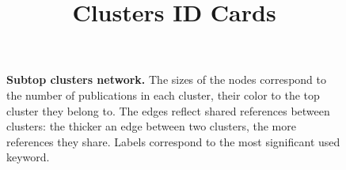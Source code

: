 \documentclass[a4paper,11pt]{report}
\title{{\bf Clusters ID Cards}}
\date{\begin{flushleft}This document gathers the ``ID Cards'' of the BC clusters found within the studied database.\\
 The BC network was built by linking pairs of publications based on the references they share - 9 out of 56 publications are in the network. The 4 clusters presented here correspond to the ones found in the subtop level grouping at least 1 publications. They gather a total of 9 publications. \\
 These ID cards displays the most frequent keywords, subject categories, journals of publication, institutions, countries, authors, references and reference journals of the publications of each cluster. The significance of an item $\sigma = \sqrt{N} (f - p) / \sqrt{p(1-p)}$ - where $N$ is the number of publications within the cluster and $f$ and $p$ are the proportion of publications respectively within the cluster and within the database displaying that item - is also given.\\
\vspace{1cm}
\copyright Sebastian Grauwin - BIBLIOTOOLS/BiblioTools3.2 (October 2017) \end{flushleft}}
\begin{document}
\begin{landscape}
\maketitle


\clearpage

\begin{figure}[h!]
\begin{center}
\caption{{\bf Subtop clusters network.} The sizes of the nodes correspond to the number of publications in each cluster, their color to the top cluster they belong to. The edges reflect shared references between clusters: the thicker an edge between two clusters, the more references they share. Labels correspond to the most significant used keyword. }
\end{center}
\end{figure}



\clearpage


\end{landscape}
\end{document}
